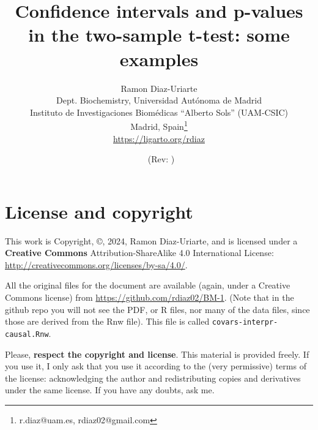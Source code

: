 \documentclass[a4paper,11pt]{article}\usepackage[]{graphicx}\usepackage[]{xcolor}
\newcommand{\blu}[1]{{\textcolor {blue} {#1}}}
\newcommand{\Burl}[1]{\blu{\url{#1}}}
\numberwithin{exercise}{section}
\begin{document}
\title{Confidence intervals and p-values in the two-sample t-test: some examples}


\author{Ramon Diaz-Uriarte\\
  Dept. Biochemistry, Universidad Aut\'onoma de Madrid \\
  Instituto de Investigaciones Biom\'edicas ``Alberto Sols'' (UAM-CSIC)\\
  Madrid, Spain{\footnote{r.diaz@uam.es, rdiaz02@gmail.com}} \\
  {\small \Burl{https://ligarto.org/rdiaz}} \\
}


\date{\gitAuthorDate\ {\footnotesize (Rev: \gitAbbrevHash)}}



\maketitle





\section*{License and copyright}\label{license}
This work is Copyright, \copyright, 2024, Ramon Diaz-Uriarte, and is
licensed under a \textbf{Creative Commons } Attribution-ShareAlike 4.0
International License:
\Burl{http://creativecommons.org/licenses/by-sa/4.0/}.

\centerline \ccbysa



All the original files for the document are available (again, under a Creative
Commons license) from \Burl{https://github.com/rdiaz02/BM-1}. (Note that in the
github repo you will not see the PDF, or R files, nor many of the data files,
since those are derived from the Rnw file). This file is called \texttt{covars-interpr-causal.Rnw}.

\vspace*{10pt}

Please, \textbf{respect the copyright and license}. This material is
  provided freely. If you use it, I only ask that you use it according to the
  (very permissive) terms of the license: acknowledging the author and
  redistributing copies and derivatives under the same license. If you have any
  doubts, ask me.
\end{document}
